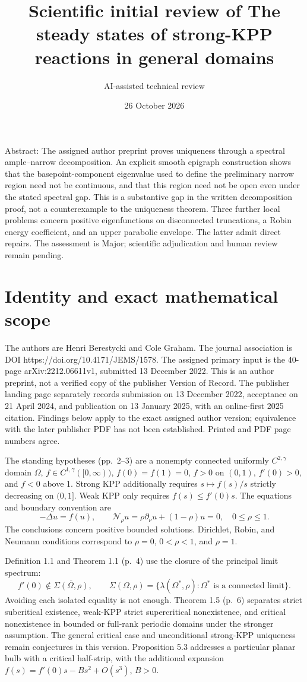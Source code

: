 \documentclass[10pt]{article}
\title{Scientific initial review of
The steady states of strong-KPP reactions in general domains}
\author{AI-assisted technical review}
\date{26 October 2026}
\begin{document}
\maketitle
Abstract: The assigned author preprint proves uniqueness through a spectral ample–narrow decomposition. An explicit smooth epigraph construction shows that the basepoint-component eigenvalue used to define the preliminary narrow region need not be continuous, and that this region need not be open even under the stated spectral gap. This is a substantive gap in the written decomposition proof, not a counterexample to the uniqueness theorem. Three further local problems concern positive eigenfunctions on disconnected truncations, a Robin energy coefficient, and an upper parabolic envelope. The latter admit direct repairs. The assessment is Major; scientific adjudication and human review remain pending.\par
\section*{Identity and exact mathematical scope}
The authors are Henri Berestycki and Cole Graham. The journal association is DOI https://doi.org/10.4171/JEMS/1578. The assigned primary input is the 40-page arXiv:2212.06611v1, submitted 13 December 2022. This is an author preprint, not a verified copy of the publisher Version of Record. The publisher landing page separately records submission on 13 December 2022, acceptance on 21 April 2024, and publication on 13 January 2025, with an online-first 2025 citation. Findings below apply to the exact assigned author version; equivalence with the later publisher PDF has not been established. Printed and PDF page numbers agree.\par
The standing hypotheses (pp. 2–3) are a nonempty connected uniformly \(C^{2,\gamma}\) domain \(\Omega\), \(f\in C^{1,\gamma}([0,\infty))\), \(f(0)=f(1)=0\), \(f>0\) on \((0,1)\), \(f'(0)>0\), and \(f<0\) above 1. Strong KPP additionally requires \(s\mapsto f(s)/s\) strictly decreasing on \((0,1]\). Weak KPP only requires \(f(s)\le f'(0)s\). The equations and boundary convention are \[-\Delta u=f(u),\qquad
 \mathcal N_\rho u=\rho\partial_\nu u+(1-\rho)u=0,\quad 0\le\rho\le1.\] The conclusions concern positive bounded solutions. Dirichlet, Robin, and Neumann conditions correspond to \(\rho=0\), \(0<\rho<1\), and \(\rho=1\).\par
Definition 1.1 and Theorem 1.1 (p. 4) use the closure of the principal limit spectrum: \[f'(0)\notin\overline{\Sigma(\Omega,\rho)},\qquad
 \Sigma(\Omega,\rho)=\{\lambda(\Omega^*,\rho):\Omega^*\text{ is a connected limit}\}.\] Avoiding each isolated equality is not enough. Theorem 1.5 (p. 6) separates strict subcritical existence, weak-KPP strict supercritical nonexistence, and critical nonexistence in bounded or full-rank periodic domains under the stronger assumption. The general critical case and unconditional strong-KPP uniqueness remain conjectures in this version. Proposition 5.3 addresses a particular planar bulb with a critical half-strip, with the additional expansion \(f(s)=f'(0)s-Bs^2+O(s^3)\), \(B>0\).\par
\end{document}
